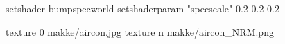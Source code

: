 setshader bumpspecworld
setshaderparam "specscale" 0.2 0.2 0.2

texture 0 makke/aircon.jpg
texture n makke/aircon_NRM.png
